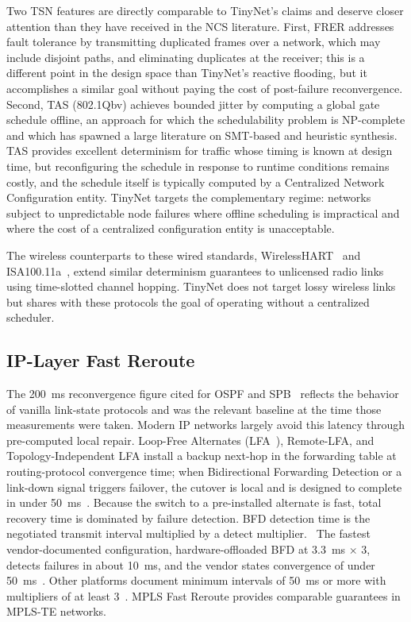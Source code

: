 Two TSN features are directly comparable to TinyNet's claims and deserve closer attention than they have received in the NCS literature. First, FRER addresses fault tolerance by transmitting duplicated frames over a network, which may include disjoint paths, and eliminating duplicates at the receiver; this is a different point in the design space than TinyNet's reactive flooding, but it accomplishes a similar goal without paying the cost of post-failure reconvergence. Second, TAS (802.1Qbv) achieves bounded jitter by computing a global gate schedule offline, an approach for which the schedulability problem is NP-complete and which has spawned a large literature on SMT-based and heuristic synthesis.~\cite{craciunas2016combined,tsnsched,tsn_scheduling_survey} TAS provides excellent determinism for traffic whose timing is known at design time, but reconfiguring the schedule in response to runtime conditions remains costly, and the schedule itself is typically computed by a Centralized Network Configuration entity. TinyNet targets the complementary regime: networks subject to unpredictable node failures where offline scheduling is impractical and where the cost of a centralized configuration entity is unacceptable.

The wireless counterparts to these wired standards, WirelessHART~\cite{wirelesshart} and ISA100.11a~\cite{isa100}, extend similar determinism guarantees to unlicensed radio links using time-slotted channel hopping. TinyNet does not target lossy wireless links but shares with these protocols the goal of operating without a centralized scheduler.

\subsection{IP-Layer Fast Reroute}
\label{sec:related:frr}
 
The 200~ms reconvergence figure cited for OSPF and SPB~\cite{ospf,spb} reflects the behavior of vanilla link-state protocols and was the relevant baseline at the time those measurements were taken. Modern IP networks largely avoid this latency through pre-computed local repair. Loop-Free Alternates (LFA~\cite{rfc5286}), Remote-LFA, and Topology-Independent LFA install a backup next-hop in the forwarding table at routing-protocol convergence time; when Bidirectional Forwarding Detection or a link-down signal triggers failover, the cutover is local and is designed to complete in under 50~ms~\cite{cisco_lfa}. Because the switch to a pre-installed alternate is fast, total recovery time is dominated by failure detection. BFD detection time is the negotiated transmit interval multiplied by a detect multiplier.~\cite{rfc5880} The fastest vendor-documented configuration, hardware-offloaded BFD at 3.3~ms $\times$ 3, detects failures in about 10~ms, and the vendor states convergence of under 50~ms~\cite{cisco_ncs4200_bfd}. Other platforms document minimum intervals of 50~ms or more with multipliers of at least 3~\cite{juniper_bfd}. MPLS Fast Reroute provides comparable guarantees in MPLS-TE networks.

